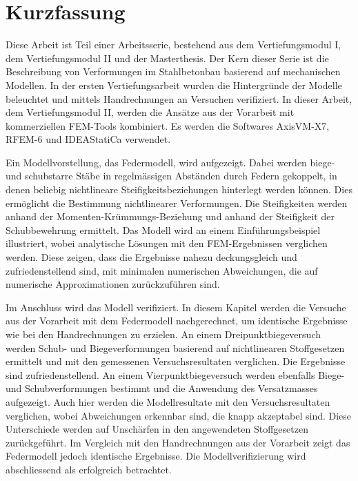 \chapter*{Kurzfassung}

Diese Arbeit ist Teil einer Arbeitsserie, bestehend aus dem Vertiefungsmodul I, dem Vertiefungsmodul II und der Masterthesis. Der Kern dieser Serie ist die Beschreibung von Verformungen im Stahlbetonbau basierend auf mechanischen Modellen. In der ersten Vertiefungsarbeit wurden die Hintergründe der Modelle beleuchtet und mittels Handrechnungen an Versuchen verifiziert. In dieser Arbeit, dem Vertiefungsmodul II, werden die Ansätze aus der Vorarbeit mit kommerziellen FEM-Tools kombiniert. Es werden die Softwares AxisVM-X7, RFEM-6 und IDEAStatiCa verwendet.

Ein Modellvorstellung, das Federmodell, wird aufgezeigt. Dabei werden biege- und schubstarre Stäbe in regelmässigen Abständen durch Federn gekoppelt, in denen beliebig nichtlineare Steifigkeitsbeziehungen hinterlegt werden können. Dies ermöglicht die Bestimmung nichtlinearer Verformungen. Die Steifigkeiten werden anhand der Momenten-Krümmungs-Beziehung und anhand der Steifigkeit der Schubbewehrung ermittelt. Das Modell wird an einem Einführungsbeispiel illustriert, wobei analytische Lösungen mit den FEM-Ergebnissen verglichen werden. Diese zeigen, dass die Ergebnisse nahezu deckungsgleich und zufriedenstellend sind, mit minimalen numerischen Abweichungen, die auf numerische Approximationen zurückzuführen sind.

Im Anschluss wird das Modell verifiziert. In diesem Kapitel werden die Versuche aus der Vorarbeit mit dem Federmodell nachgerechnet, um identische Ergebnisse wie bei den Handrechnungen zu erzielen. An einem Dreipunktbiegeversuch werden Schub- und Biegeverformungen basierend auf nichtlinearen Stoffgesetzen ermittelt und mit den gemessenen Versuchsresultaten verglichen. Die Ergebnisse sind zufriedenstellend. An einem Vierpunktbiegeversuch werden ebenfalls Biege- und Schubverformungen bestimmt und die Anwendung des Versatzmasses aufgezeigt. Auch hier werden die Modellresultate mit den Versuchsresultaten verglichen, wobei Abweichungen erkennbar sind, die knapp akzeptabel sind. Diese Unterschiede werden auf Unschärfen in den angewendeten Stoffgesetzen zurückgeführt. Im Vergleich mit den Handrechnungen aus der Vorarbeit zeigt das Federmodell jedoch identische Ergebnisse. Die Modellverifizierung wird abschliessend als erfolgreich betrachtet.

